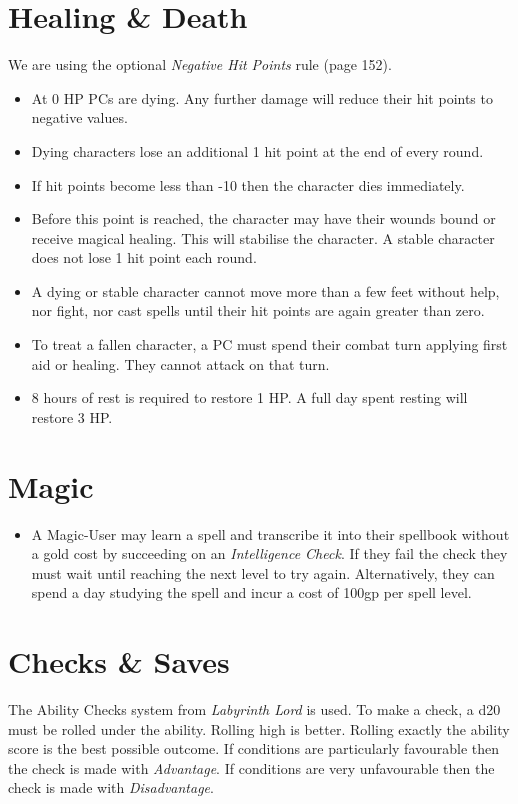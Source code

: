 \section{Healing \& Death}
We are using the optional \emph{Negative Hit Points} rule (page 152).
\begin{itemize}
	\item At 0 HP PCs are dying. Any further damage will reduce their hit
	      points to negative values.
	\item Dying characters lose an additional 1 hit point at the end of every
	      round.
	\item If hit points become less than -10 then the character dies immediately.
	\item Before this point is reached, the character may have their wounds
	      bound or receive magical healing. This will stabilise the character. A
	      stable character does not lose 1 hit point each round.
	\item A dying or stable character cannot move more than a few feet without
	      help, nor fight, nor cast spells until their hit points are again greater
	      than zero.
	\item To treat a fallen character, a PC must spend their combat turn
	      applying first aid or healing. They cannot attack on that turn.
	\item 8 hours of rest is required to restore 1 HP\@. A full day spent
	      resting will restore 3 HP\@.
\end{itemize}

\section{Magic}
\begin{itemize}
	\item A Magic-User may learn a spell and transcribe it into their spellbook
	      without a gold cost by succeeding on an \emph{Intelligence Check}. If they
	      fail the check they must wait until reaching the next level to try again.
	      Alternatively, they can spend a day studying the spell and incur a cost of
	      100gp per spell level.
\end{itemize}

\section{Checks \& Saves}
The Ability Checks system from \emph{Labyrinth Lord} is used. To make a check, a
d20 must be rolled under the ability. Rolling high is better. Rolling exactly
the ability score is the best possible outcome. If conditions are particularly
favourable then the check is made with \emph{Advantage}. If conditions are very
unfavourable then the check is made with \emph{Disadvantage}.

